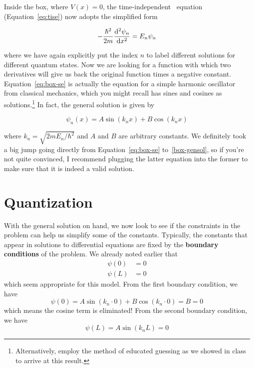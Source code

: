 Inside the box, where $V(x) = 0$, the time-independent \Sch\ equation (Equation~\ref{eq:tise}) now adopts the simplified form
\begin{tcolorbox}[title=\Sch\ equation for particle in a box] \vspace{-2ex}
	\begin{equation}
		-\frac{\hbar^2}{2m} \dv[2]{\psi_n}{x} = E_n\psi_n  \label{eq:box-se}
	\end{equation}
\end{tcolorbox}
where we have again explicitly put the index $n$ to label different solutions for different quantum states. Now we are looking for a function with which two derivatives will give us back the original function times a negative constant. Equation~\ref{eq:box-se} is actually the equation for a simple harmonic oscillator from classical mechanics, which you might recall has sines and cosines as solutions.\footnote{Alternatively, employ the method of educated guessing as we showed in class to arrive at this result.} In fact, the general solution is given by 
\begin{tcolorbox}[title=General solution to particle in a box] \vspace{-2ex}
	\begin{equation}
		\psi_n(x) = A\sin(k_nx) + B\cos(k_nx) \label{box-gensol}
	\end{equation}
\end{tcolorbox}
where $k_n = \sqrt{2mE_n/\hbar^2}$ and $A$ and $B$ are arbitrary constants. We definitely took a big jump going directly from Equation~\ref{eq:box-se} to~\ref{box-gensol}, so if you're not quite convinced, I recommend plugging the latter equation into the former to make sure that it is indeed a valid solution.


\section{Quantization}
With the general solution on hand, we now look to see if the constraints in the problem can help us simplify some of the constants. Typically, the constants that appear in solutions to differential equations are fixed by the \textbf{boundary conditions} of the problem. We already noted earlier that
\begin{align}
	\psi(0) &= 0 \\
	\psi(L) &= 0
\end{align}
which seem appropriate for this model. From the first boundary condition, we have
\begin{equation*}
	\psi(0) = A\sin(k_n \cdot 0) + B\cos(k_n \cdot 0) = B = 0
\end{equation*}
which means the cosine term is eliminated! From the second boundary condition, we have
\begin{equation*}
	\psi(L) = A\sin(k_nL) = 0
\end{equation*}

